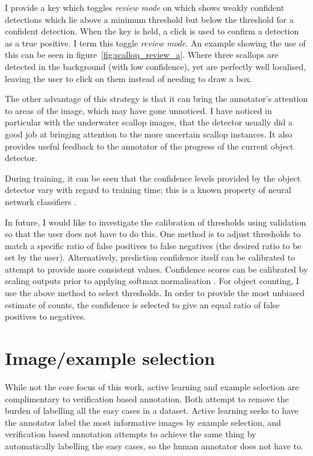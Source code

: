 I provide a key which toggles \emph{review mode} on which shows weakly confident detections which lie above a minimum threshold but below the threshold for a confident detection. When the key is held, a click is used to confirm a detection as a true positive. I term this toggle \emph{review mode}.  An example showing the use of this can be seen in figure~\ref{fig:scallop_review_a}. Where three scallops are detected in the background (with low confidence), yet are perfectly well localised, leaving the user to click on them instead of needing to draw a box.

The other advantage of this strategy is that it can bring the annotator's attention to areas of the image, which may have gone unnoticed. I have noticed in particular with the underwater scallop images, that the detector usually did a good job at bringing attention to the more uncertain scallop instances. It also provides useful feedback to the annotator of the progress of the current object detector. 

During training, it can be seen that the confidence levels provided by the object detector vary with regard to training time; this is a known property of neural network classifiers \cite{Guo2017}.

In future, I would like to investigate the calibration of thresholds using validation so that the user does not have to do this. One method is to adjust thresholds to match a specific ratio of false positives to false negatives (the desired ratio to be set by the user). Alternatively, prediction confidence itself can be calibrated to attempt to provide more consistent values. Confidence scores can be calibrated by scaling outputs prior to applying softmax normalisation \cite{Guo2017}. For object counting, I use the above method to select thresholds. In order to provide the most unbiased estimate of counts, the confidence is selected to give an equal ratio of false positives to negatives.
 
\section{Image/example selection}
\label{sec:example_selection}

While not the core focus of this work, active learning and example selection are complimentary to verification based annotation. Both attempt to remove the burden of labelling all the easy cases in a dataset. Active learning seeks to have the annotator label the most informative images by example selection, and verification based annotation attempts to achieve the same thing by automatically labelling the easy cases, so the human annotator does not have to. 

